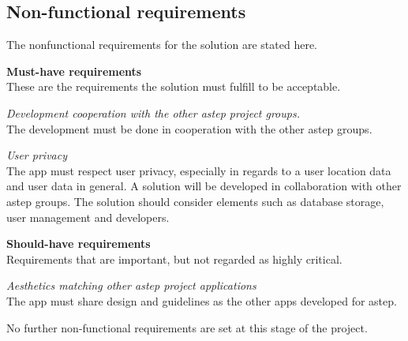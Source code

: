 \subsection{Non-functional requirements}
The nonfunctional requirements for the solution are stated here.

\textbf{Must-have requirements}\\
These are the requirements the solution must fulfill to be acceptable.

\textit{Development cooperation with the other \gls{astep} project groups.}\\
The development must be done in cooperation with the other \gls{astep} groups.

\textit{User privacy}\\
The app must respect user privacy, especially in regards to a user location data and user data in general.
A solution will be developed in collaboration with other \gls{astep} groups.
The solution should consider elements such as database storage, user management and developers.

\textbf{Should-have requirements}\\
Requirements that are important, but not regarded as highly critical.

\textit{Aesthetics matching other \gls{astep} project applications}\\
The app must share design and guidelines as the other apps developed for \gls{astep}.

No further non-functional requirements are set at this stage of the project.